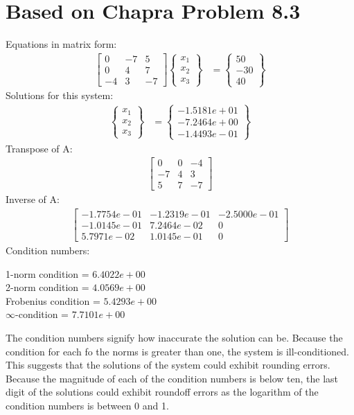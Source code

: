 \documentclass{article}
\begin{document}
\section{Based on Chapra Problem 8.3}
Equations in matrix form:
\begin{align*}
\begin{bmatrix}
0 & -7 & 5\\
0 & 4 & 7\\
-4 & 3 & -7
\end{bmatrix}
\begin{Bmatrix}
x_1\\
x_2\\
x_3
\end{Bmatrix} & =
\begin{Bmatrix}
50\\
-30\\
40
\end{Bmatrix}
\end{align*}
Solutions for this system:
\begin{align*}
\begin{Bmatrix}
x_1\\
x_2\\
x_3
\end{Bmatrix} & = 
\begin{Bmatrix}
-1.5181e+01\\
-7.2464e+00\\
-1.4493e-01
\end{Bmatrix}
\end{align*}
Transpose of A:
\begin{align*}
\begin{bmatrix}
0 & 0 & -4\\
-7 & 4 & 3\\
5 & 7 & -7
\end{bmatrix}
\end{align*}
Inverse of A:
\begin{align*}
\begin{bmatrix}
-1.7754e-01 & -1.2319e-01 & -2.5000e-01\\
-1.0145e-01 & 7.2464e-02 & 0\\
5.7971e-02 & 1.0145e-01 & 0
\end{bmatrix}
\end{align*}
Condition numbers:
\begin{center}
1-norm condition = $6.4022e+00$\\
2-norm condition = $4.0569e+00$\\
Frobenius condition = $5.4293e+00$\\
$\infty$-condition = $7.7101e+00$\\
\end{center}
The condition numbers signify how inaccurate the solution can be. Because the condition for each fo the norms is greater than one, the system is ill-conditioned. This suggests that the solutions of the system could exhibit rounding errors. Because the magnitude of each of the condition numbers is below ten, the last digit of the solutions could exhibit roundoff errors as the logarithm of the condition numbers is between 0 and 1.
\pagebreak 
\end{document}
